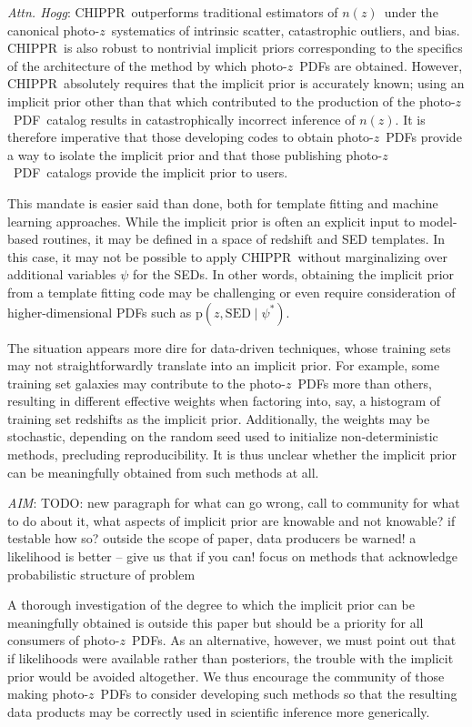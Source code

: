 \documentclass[iop]{emulateapj}
\newcommand{\todo}[3]{{\color{#2}\emph{#1}: #3}}
\newcommand{\aim}[1]{\todo{AIM}{red}{#1}}
\newcommand{\dwh}[1]{\todo{Attn. Hogg}{blue}{#1}}
\newcommand{\project}[1]{\textsc{#1}}
\newcommand{\Chippr}{\project{CHIPPR}}%
\newcommand{\pr}[1]{\ensuremath{\mathrm{p}(#1)}}%
\newcommand{\gvn}{\mid}%
\newcommand{\pz}{photo-$z$}
\newcommand{\pzpdf}{\pz\ PDF}%
\newcommand{\nz}{$n(z)$}
\begin{document}
\dwh{\Chippr\ outperforms traditional estimators of \nz\ under the canonical \pz\ systematics of intrinsic scatter, catastrophic outliers, and bias.
\Chippr\ is also robust to nontrivial implicit priors corresponding to the specifics of the architecture of the method by which \pzpdf s are obtained.
However, \Chippr\ absolutely requires that the implicit prior is accurately known; using an implicit prior other than that which contributed to the production of the \pzpdf\ catalog results in catastrophically incorrect inference of \nz.
It is therefore imperative that those developing codes to obtain \pzpdf s provide a way to isolate the implicit prior and that those publishing \pzpdf\ catalogs provide the implicit prior to users.

This mandate is easier said than done, both for template fitting and machine learning approaches.
While the implicit prior is often an explicit input to model-based routines, it may be defined in a space of redshift and SED templates.
In this case, it may not be possible to apply \Chippr\ without marginalizing over additional variables $\psi$ for the SEDs.
In other words, obtaining the implicit prior from a template fitting code may be challenging or even require consideration of higher-dimensional PDFs such as $\pr{z, \mathrm{SED} \gvn \psi^{*}}$.

The situation appears more dire for data-driven techniques, whose training sets may not straightforwardly translate into an implicit prior.
For example, some training set galaxies may contribute to the \pzpdf s more than others, resulting in different effective weights when factoring into, say, a histogram of training set redshifts as the implicit prior.
Additionally, the weights may be stochastic, depending on the random seed used to initialize non-deterministic methods, precluding reproducibility.
It is thus unclear whether the implicit prior can be meaningfully obtained from such methods at all.

\aim{TODO: new paragraph for what can go wrong, call to community for what to do about it, what aspects of implicit prior are knowable and not knowable?
	if testable how so? outside the scope of paper, data producers be warned!
	a likelihood is better -- give us that if you can!
	focus on methods that acknowledge probabilistic structure of problem}

A thorough investigation of the degree to which the implicit prior can be meaningfully obtained is outside this paper but should be a priority for all consumers of \pzpdf s.
As an alternative, however, we must point out that if likelihoods were available rather than posteriors, the trouble with the implicit prior would be avoided altogether.
We thus encourage the community of those making \pzpdf s to consider developing such methods so that the resulting data products may be correctly used in scientific inference more generically.}
\end{document}
